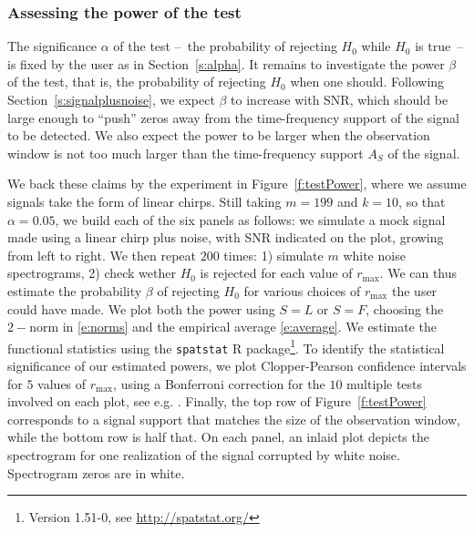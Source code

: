 \subsubsection{Assessing the power of the test}
\label{s:beta}
The significance $\alpha$ of the test --~the probability of rejecting $H_0$
while $H_0$ is true~-- is fixed by the user as in Section~\ref{s:alpha}. It
remains to investigate the power $\beta$ of the test, that is, the probability
of rejecting $H_0$ when one should. Following Section~\ref{s:signalplusnoise},
we expect $\beta$ to increase with SNR, which should be large enough to ``push''
zeros away from the time-frequency support of the signal to be detected. We also
expect the power to be larger when the observation window is not too much larger
than the time-frequency support $A_S$ of the signal.


We back these claims by the experiment in Figure~\ref{f:testPower}, where we
assume signals take the form of linear chirps. Still taking $m=199$ and $k=10$,
so that $\alpha=0.05$, we build each of the six panels as follows: we simulate a
mock signal made using a linear chirp plus noise, with SNR indicated on the
plot, growing from left to right. We then repeat $200$ times: 1) simulate $m$
white noise spectrograms, 2) check wether $H_0$ is rejected for each value
of $r_{\max}$. We can thus estimate the probability $\beta$ of rejecting $H_0$
for various choices of $r_{\max}$ the user could have made. We plot both the
power using $S=L$ or $S=F$, choosing the $2-$norm in \eqref{e:norms} and the
empirical average \eqref{e:average}. We estimate the functional statistics using the \texttt{spatstat} R
package\footnote{Version 1.51-0, see \url{http://spatstat.org/}}. To identify
the statistical significance of our estimated powers, we plot Clopper-Pearson
confidence intervals for $5$ values of $r_{\max}$, using a Bonferroni correction for the $10$ multiple tests involved
on each plot, see e.g. \cite{Was13}. Finally, the top row of
Figure~\ref{f:testPower} corresponds to a signal support that matches the size of
the observation window, while the bottom row is half that. On each panel, an inlaid plot
depicts the spectrogram for one realization of the signal corrupted by white
noise. Spectrogram zeros are in white.

